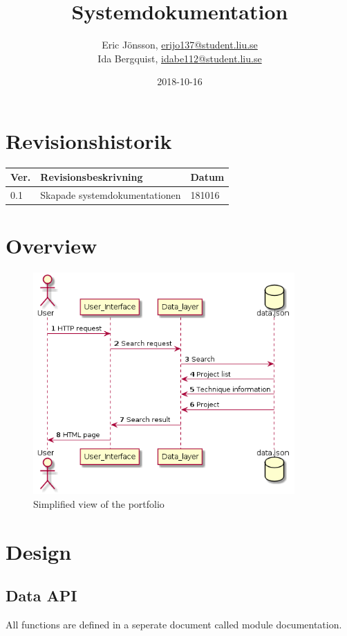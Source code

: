 \documentclass{TDP003mall}
\author{Eric Jönsson, \url{erijo137@student.liu.se}\\
  Ida Bergquist, \url{idabe112@student.liu.se}}
\title{Systemdokumentation}
\date{2018-10-16}
\begin{document}
\projectpage
\tableofcontents
\newpage
\section{Revisionshistorik}
\begin{table}[!h]
\begin{tabularx}{\linewidth}{|l|X|l|}
\hline
\textbf{Ver.} & \textbf{Revisionsbeskrivning} & \textbf{Datum} \\\hline
0.1 & Skapade systemdokumentationen & 181016 \\\hline
\end{tabularx}
\end{table}

\section{Overview}
\begin{figure}[h!]
    \centering
    \includegraphics[width=10cm]{sevenskdiagram.png}
    \caption{Simplified view of the portfolio}
    \label{sekvensdiagram}
\end{figure}

\section{Design}
\subsection{Data API}
All functions are defined in a seperate document called module documentation.
\end{document}

